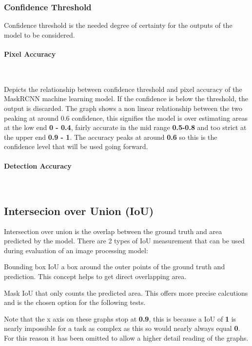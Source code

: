\documentclass[final]{cmpreport_02}
\begin{document}
\subsubsection{Confidence Threshold} \label{confidenceThresholdEval}

Confidence threshold is the needed degree of certainty for the outputs of the model to be considered.

\paragraph{Pixel Accuracy} \

 Depicts the relationship between confidence threshold and pixel accuracy of the MaskRCNN machine learning model.
If the confidence is below the threshold, the output is discarded.
The graph shows a non linear relationship between the two peaking at around 0.6 confidence, this signifies the model is over estimating areas at the low end \textbf{0 - 0.4}, fairly accurate in the mid range \textbf{0.5-0.8} and too strict at the upper end \textbf{0.9 - 1}.
The accuracy peaks at around \textbf{0.6} so this is the confidence level that will be used going forward.

\paragraph{Detection Accuracy} \



\subsection{Intersecion over Union (IoU)}
Intersection over union is the overlap between the ground truth and area predicted by the model.
There are 2 types of IoU measurement that can be used during evaluation of an image processing model:

Bounding box IoU a box around the outer points of the ground truth and prediction.
This concept helps to get direct overlapping area.

Mask IoU that only counts the predicted area. This offers more precise calcutions and is the chosen option for the following tests.

Note that the x axis on these graphs stop at \textbf{0.9}, this is because a IoU of \textbf{1} is nearly impossible for a task as complex as this so would nearly always equal \textbf{0}. For this reason it has been omitted to allow a higher detail reading of the graphs.
\end{document}
